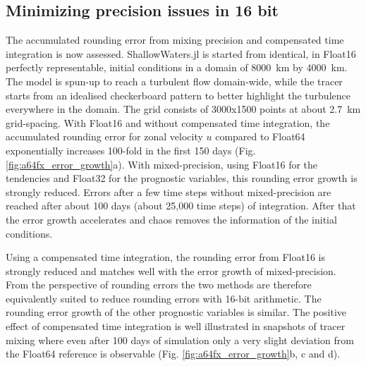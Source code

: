 \subsection{Minimizing precision issues in 16 bit}
The accumulated rounding error from mixing precision and compensated time integration is now assessed.
ShallowWaters.jl is started from identical, in Float16 perfectly representable, initial conditions in a domain of
8000~km by 4000~km. The model is spun-up to reach a turbulent flow domain-wide, while the tracer starts from
an idealised checkerboard pattern to better highlight the turbulence everywhere in the domain.  The grid consists
of 3000x1500 points at about 2.7~km grid-spacing. With Float16 and without compensated time integration,
the accumulated rounding error for zonal velocity $u$ compared to Float64 exponentially increases 100-fold in
the first 150 days (Fig. \ref{fig:a64fx_error_growth}a). With mixed-precision, using Float16 for the tendencies
and Float32 for the prognostic variables, this rounding error growth is strongly reduced. Errors after a few time steps
without mixed-precision are reached after about 100 days (about 25,000 time steps) of integration. After
that the error growth accelerates and chaos removes the information of the initial conditions.

Using a compensated time integration, the rounding error from Float16 is strongly reduced and matches well with the
error growth of mixed-precision. From the perspective of rounding errors the two methods are therefore equivalently
suited to reduce rounding errors with 16-bit arithmetic. The rounding error growth of the other prognostic variables is
similar. The positive effect of compensated time integration is well illustrated in snapshots of tracer mixing where even
after 100 days of simulation only a very slight deviation from the Float64 reference is observable
(Fig. \ref{fig:a64fx_error_growth}b, c and d).

